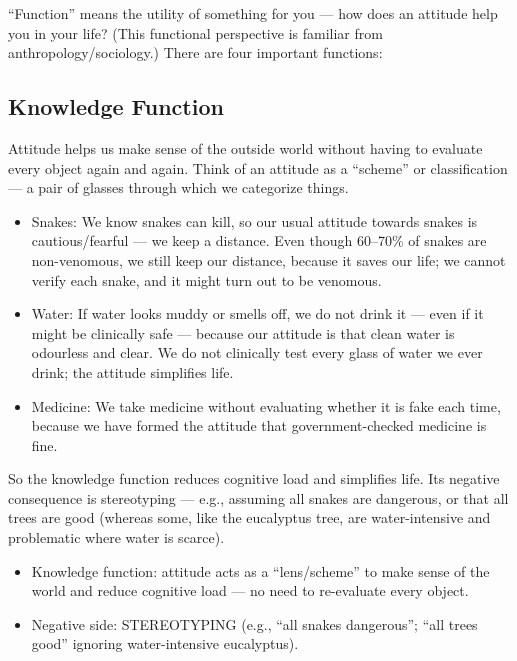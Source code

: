 ``Function'' means the utility of something for you --- how does an attitude help you in your life? (This functional perspective is familiar from anthropology/sociology.) There are four important functions:

\subsection{Knowledge Function}

Attitude helps us make sense of the outside world without having to evaluate every object again and again. Think of an attitude as a ``scheme'' or classification --- a pair of glasses through which we categorize things.

\begin{itemize}
\item Snakes: We know snakes can kill, so our usual attitude towards snakes is cautious/fearful --- we keep a distance. Even though 60--70\% of snakes are non-venomous, we still keep our distance, because it saves our life; we cannot verify each snake, and it might turn out to be venomous.
\item Water: If water looks muddy or smells off, we do not drink it --- even if it might be clinically safe --- because our attitude is that clean water is odourless and clear. We do not clinically test every glass of water we ever drink; the attitude simplifies life.
\item Medicine: We take medicine without evaluating whether it is fake each time, because we have formed the attitude that government-checked medicine is fine.
\end{itemize}

So the knowledge function reduces cognitive load and simplifies life. Its negative consequence is stereotyping --- e.g., assuming all snakes are dangerous, or that all trees are good (whereas some, like the eucalyptus tree, are water-intensive and problematic where water is scarce).

\begin{KeyConcept}
\begin{itemize}
\item Knowledge function: attitude acts as a ``lens/scheme'' to make sense of the world and reduce cognitive load --- no need to re-evaluate every object.
\item Negative side: STEREOTYPING (e.g., ``all snakes dangerous''; ``all trees good'' ignoring water-intensive eucalyptus).
\end{itemize}
\end{KeyConcept}

